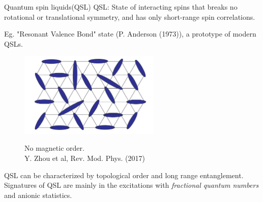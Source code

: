\begingroup
\small
\begin{frame}{Quantum spin liquids(QSL)}
    QSL: State of interacting spins that breaks no rotational or translational symmetry, and has only short-range spin correlations.
    
    Eg. "Resonant Valence Bond" state (P. Anderson (1973)), a prototype of modern QSLs.
    \begin{figure}
        \begin{minipage}[c]{0.65\textwidth}
            \centering
            \includegraphics[width = 0.6\textwidth]{figures/RVB.jpg}
        \end{minipage}
        \begin{minipage}[l]{0.15\textwidth}
            \footnotesize{No magnetic order.}
            \vspace{.5cm}\\
            \tiny{Y. Zhou et al, Rev. Mod. Phys. (2017)}\hfill
        \end{minipage}
    \end{figure}
    \normalsize
     QSL can be characterized by topological order and long range entanglement. Signatures of QSL are mainly in the excitations with \emph{fractional quantum numbers} and anionic statistics. 
\end{frame}
\endgroup


